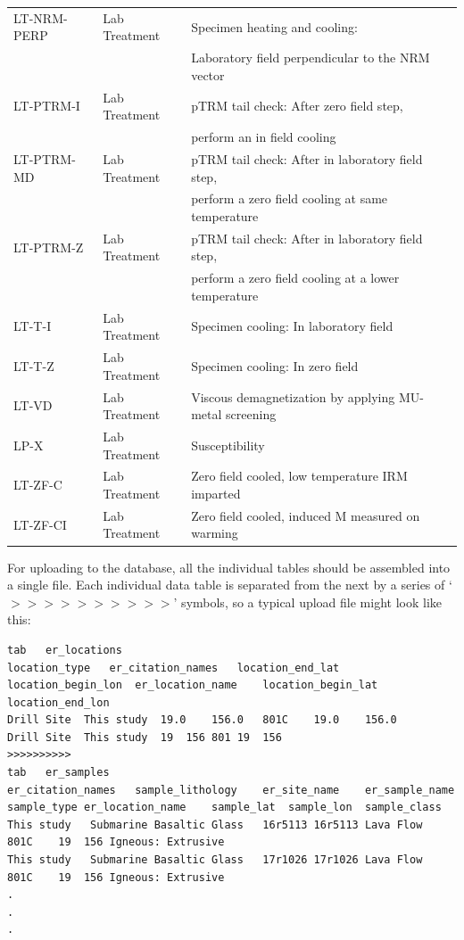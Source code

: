 \documentclass[11pt]{book}
\begin{document}
{{{\begin{tabular}{lll}
LT-NRM-PERP \qquad & Lab Treatment \qquad & Specimen heating and cooling: \\
\qquad &\qquad &Laboratory field perpendicular to the NRM vector\\
LT-PTRM-I \qquad & Lab Treatment \qquad & pTRM tail check: After zero field step, \\
\qquad &\qquad &perform an in field cooling\\
LT-PTRM-MD \qquad & Lab Treatment \qquad & pTRM tail check: After in laboratory field step, \\
\qquad &\qquad &perform a zero field cooling at same temperature\\
LT-PTRM-Z \qquad & Lab Treatment \qquad & pTRM tail check: After in laboratory field step,\\
\qquad &\qquad & perform a zero field cooling at a lower temperature\\
LT-T-I \qquad & Lab Treatment \qquad & Specimen cooling: In laboratory field\\
LT-T-Z \qquad & Lab Treatment \qquad & Specimen cooling: In zero field\\
LT-VD \qquad & Lab Treatment \qquad & Viscous demagnetization by applying MU-metal screening\\
LP-X \qquad & Lab Treatment \qquad & Susceptibility\\
LT-ZF-C \qquad & Lab Treatment \qquad & Zero field cooled, low temperature IRM imparted\\
LT-ZF-CI \qquad & Lab Treatment \qquad & Zero field cooled, induced M measured on warming\\
\hline
\end{tabular}

For uploading to the database, all the individual tables should be assembled into a single file.  Each individual data table is separated from the next by a series of `$>>>>>>>>>>$' symbols, so a typical upload file might look like this:

\begin{verbatim}
tab   er_locations
location_type	er_citation_names	location_end_lat	location_begin_lon	er_location_name	location_begin_lat	location_end_lon
Drill Site	This study	19.0	156.0	801C	19.0	156.0
Drill Site	This study	19	156	801	19	156
>>>>>>>>>>
tab   er_samples
er_citation_names	sample_lithology	er_site_name	er_sample_name	sample_type	er_location_name	sample_lat	sample_lon	sample_class
This study   Submarine Basaltic Glass	16r5113	16r5113	Lava Flow	801C	19	156	Igneous: Extrusive
This study   Submarine Basaltic Glass	17r1026	17r1026	Lava Flow	801C	19	156	Igneous: Extrusive
.
.
.
\end{verbatim}

}}}
\end{document}
